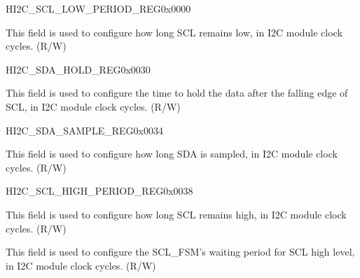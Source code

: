 \begin{register}{H}{I2C\_SCL\_LOW\_PERIOD\_REG}{0x0000}\label{regdesc:I2CSCLLOWPERIODREG}
%
%
\regnewline%
\begin{regdesc}\begin{reglist}
\label{fielddesc:I2CSCLLOWPERIOD}\item [I2C\_SCL\_LOW\_PERIOD] This field is used to configure how long SCL remains low, in I2C module clock cycles. (R/W)
\end{reglist}\end{regdesc}
\end{register}


\begin{register}{H}{I2C\_SDA\_HOLD\_REG}{0x0030}\label{regdesc:I2CSDAHOLDREG}
%
%
\regnewline%
\begin{regdesc}\begin{reglist}
\label{fielddesc:I2CSDAHOLDTIME}\item [I2C\_SDA\_HOLD\_TIME] This field is used to configure the time to hold the data after the falling
edge of SCL, in I2C module clock cycles. (R/W)
\end{reglist}\end{regdesc}
\end{register}


\begin{register}{H}{I2C\_SDA\_SAMPLE\_REG}{0x0034}\label{regdesc:I2CSDASAMPLEREG}
%
%
\regnewline%
\begin{regdesc}\begin{reglist}
\label{fielddesc:I2CSDASAMPLETIME}\item [I2C\_SDA\_SAMPLE\_TIME] This field is used to configure how long SDA is sampled, in I2C module clock cycles. (R/W)
\end{reglist}\end{regdesc}
\end{register}


\begin{register}{H}{I2C\_SCL\_HIGH\_PERIOD\_REG}{0x0038}\label{regdesc:I2CSCLHIGHPERIODREG}
%
%
%
\regnewline%
\begin{regdesc}\begin{reglist}
\label{fielddesc:I2CSCLHIGHPERIOD}\item [I2C\_SCL\_HIGH\_PERIOD] This field is used to configure how long SCL remains high, in I2C module clock cycles. (R/W)
\label{fielddesc:I2CSCLWAITHIGHPERIOD}\item [I2C\_SCL\_WAIT\_HIGH\_PERIOD] This field is used to configure the SCL\_FSM's waiting period for SCL high level, in I2C module clock cycles. (R/W)
\end{reglist}\end{regdesc}
\end{register}


